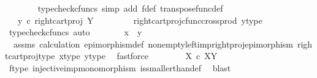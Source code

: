 \begin{isabellebody}
\ \ \ \ \ \ \isamarkupfalse%
\ {\isacharparenleft}{\kern0pt}typecheck{\isacharunderscore}{\kern0pt}cfuncs{\isacharcomma}{\kern0pt}\ simp\ add{\isacharcolon}{\kern0pt}\ f{\isacharunderscore}{\kern0pt}def\ transpose{\isacharunderscore}{\kern0pt}func{\isacharunderscore}{\kern0pt}def{\isacharparenright}{\kern0pt}\isanewline
\ \ \ \ \isamarkupfalse%
\ \isamarkupfalse%
\ {\isachardoublequoteopen}{\isachardot}{\kern0pt}{\isachardot}{\kern0pt}{\isachardot}{\kern0pt}\ {\isacharequal}{\kern0pt}\ y\ {\isasymcirc}\isactrlsub c\ {\isacharparenleft}{\kern0pt}right{\isacharunderscore}{\kern0pt}cart{\isacharunderscore}{\kern0pt}proj\ Y\ {\isasymone}{\isacharparenright}{\kern0pt}{\isachardoublequoteclose}\isanewline
\ \ \ \ \ \ \isamarkupfalse%
\ right{\isacharunderscore}{\kern0pt}cart{\isacharunderscore}{\kern0pt}proj{\isacharunderscore}{\kern0pt}cfunc{\isacharunderscore}{\kern0pt}cross{\isacharunderscore}{\kern0pt}prod\ y{\isacharunderscore}{\kern0pt}type{}\ \isamarkupfalse%
\ {\isacharparenleft}{\kern0pt}typecheck{\isacharunderscore}{\kern0pt}cfuncs{\isacharcomma}{\kern0pt}\ auto{\isacharparenright}{\kern0pt}\isanewline
\ \ \ \ \isamarkupfalse%
\ \isamarkupfalse%
\ {\isachardoublequoteopen}x\ {\isacharequal}{\kern0pt}\ y{\isachardoublequoteclose}\isanewline
\ \ \ \ \ \ \isamarkupfalse%
\ \ assms\ calculation\ epimorphism{\isacharunderscore}{\kern0pt}def{}\ nonempty{\isacharunderscore}{\kern0pt}left{\isacharunderscore}{\kern0pt}imp{\isacharunderscore}{\kern0pt}right{\isacharunderscore}{\kern0pt}proj{\isacharunderscore}{\kern0pt}epimorphism\ right{\isacharunderscore}{\kern0pt}cart{\isacharunderscore}{\kern0pt}proj{\isacharunderscore}{\kern0pt}type\ x{\isacharunderscore}{\kern0pt}type{}\ y{\isacharunderscore}{\kern0pt}type{}\ \isamarkupfalse%
\ fastforce\isanewline
\ \ \isamarkupfalse%
\isanewline
\ \ \isamarkupfalse%
\ \isamarkupfalse%
\ {\isachardoublequoteopen}X\ {\isasymle}\isactrlsub c\ X\isactrlbsup Y\isactrlesup {\isachardoublequoteclose}\isanewline
\ \ \ \ \isamarkupfalse%
\ f{\isacharunderscore}{\kern0pt}type\ injective{\isacharunderscore}{\kern0pt}imp{\isacharunderscore}{\kern0pt}monomorphism\ is{\isacharunderscore}{\kern0pt}smaller{\isacharunderscore}{\kern0pt}than{\isacharunderscore}{\kern0pt}def\ \isamarkupfalse%
\ blast\isanewline
{}\isamarkupfalse%
%
\endisatagproof
{\isafoldproof}%

\end{isabellebody}
